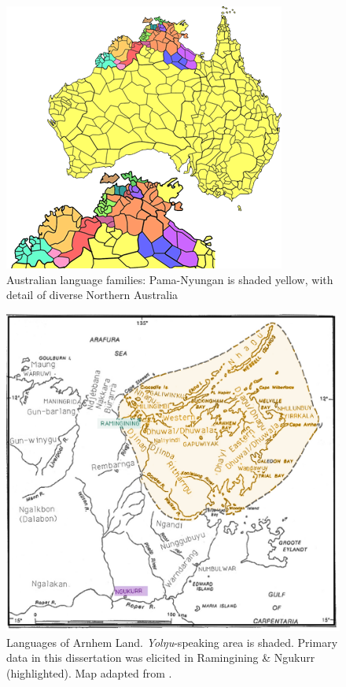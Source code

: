 \documentclass[11pt,dvipsnames]{report}
\begin{document}
\begin{figure}
		\caption[\textsc{map.} Australia \& the top end]{Australian language families: Pama-Nyungan is shaded yellow, with detail of diverse Northern Australia \citep[adapted from][]{Dixon2002a}}\label{pn}\centering
		\includegraphics[width=.6\linewidth]{ALs.png}
	\end{figure}
\begin{figure}
	\caption[\textsc{map.} Languages of Arnhem Land]{Languages of Arnhem Land. \textit{Yolŋu}-speaking area is shaded. Primary data in this dissertation was elicited in Ramingining \& Ngukurr (highlighted). Map adapted from \citet[2]{Wilkinson1991}.}\label{arn}\centering
		\includegraphics[width=.85\linewidth]{arnhem-mw2.png}
\end{figure}
\end{document}
